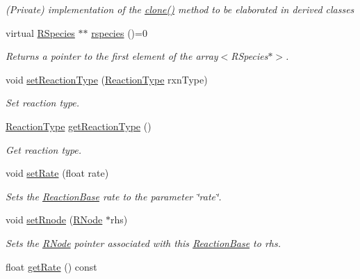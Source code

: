 \begin{DoxyCompactItemize}
\begin{DoxyCompactList}\small\item\em (Private) implementation of the \hyperlink{classReactionBase_adb75e6b8d5baf4c5d3f80f3c22a1c919}{clone()} method to be elaborated in derived classes \end{DoxyCompactList}\item 
virtual \hyperlink{classRSpecies}{R\+Species} $\ast$$\ast$ \hyperlink{classReactionBase_a5a639bc1de913192368bfbc0cab0ee88}{rspecies} ()=0
\begin{DoxyCompactList}\small\item\em Returns a pointer to the first element of the array$<$\+R\+Species$\ast$$>$. \end{DoxyCompactList}\item 
void \hyperlink{classReactionBase_aee39c0b16af5f812e1a1121a1bd52a57}{set\+Reaction\+Type} (\hyperlink{ReactionBase_8h_a360e20f142dbd097b0d0d0620111b30b}{Reaction\+Type} rxn\+Type)
\begin{DoxyCompactList}\small\item\em Set reaction type. \end{DoxyCompactList}\item 
\hyperlink{ReactionBase_8h_a360e20f142dbd097b0d0d0620111b30b}{Reaction\+Type} \hyperlink{classReactionBase_af8ff056179b45085653207177cf80306}{get\+Reaction\+Type} ()
\begin{DoxyCompactList}\small\item\em Get reaction type. \end{DoxyCompactList}\item 
void \hyperlink{classReactionBase_aa1de15d838463787ead3649676a59687}{set\+Rate} (float rate)
\begin{DoxyCompactList}\small\item\em Sets the \hyperlink{classReactionBase}{Reaction\+Base} rate to the parameter \char`\"{}rate\char`\"{}. \end{DoxyCompactList}\item 
void \hyperlink{classReactionBase_a14aed53072f6658c465d0d30136e77b7}{set\+Rnode} (\hyperlink{classRNode}{R\+Node} $\ast$rhs)
\begin{DoxyCompactList}\small\item\em Sets the \hyperlink{classRNode}{R\+Node} pointer associated with this \hyperlink{classReactionBase}{Reaction\+Base} to rhs. \end{DoxyCompactList}\item 
float \hyperlink{classReactionBase_af04f1e4d4905cdeffc7d295f49795351}{get\+Rate} () const 
$$
\end{DoxyCompactItemize}
